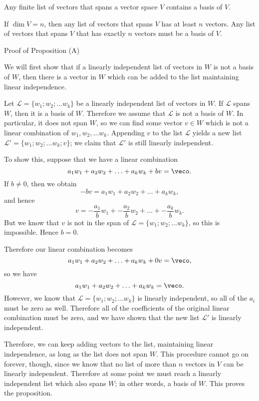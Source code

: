 {} Any finite list of vectors that spans a vector space $V$ contains a basis of $V$.  

{} If $\dim V = n$, then any list of vectors that spans $V$ has
at least $n$ vectors.  Any  list of vectors that spans $V$ that has exactly $n$ vectors must
be a basis of $V$.  


\begin{edXshowhide}{Proof of Proposition (A)}

We will first show that if a linearly independent list of vectors in $W$ is not a basis of $W$, then
there is a vector in $W$ which can be added to the list maintaining linear independence.  

Let $\mathcal{L} = \{w_1; w_2; \ldots w_k\}$ be a linearly independent list of vectors in $W$.  If
$\mathcal{L}$ spans $W$, then it is a basis of $W$.  Therefore we assume that $\mathcal{L}$ is not
a basis of $W$.  In particular, it does not span $W$, so we can find some vector $v\in W$ which is
not a linear combination of $w_1, w_2, \ldots w_k$.  Appending $v$ to the list $\mathcal{L}$
yields a new list $\mathcal{L'}=\{w_1; w_2; \ldots w_k; v\}$; we claim that $\mathcal{L'}$ 
 is still linearly independent.  
 
To show this, suppose that we have a linear combination
\[a_1w_1 + a_2w_2 + \ldots + a_k w_k + bv = \veco.\]  
If $b\ne 0$, then we obtain
\[ -bv = a_1w_1 + a_2w_2 + \ldots + a_k w_k,\]
and hence 
\[v = -\frac{a_1}{b}w_1 + -\frac{a_2}{b}w_2 + \ldots + -\frac{a_k}{b}w_k.\]
But we know that $v$ is not in the span of $\mathcal{L}=\{w_1; w_2; \ldots w_k\}$, so this is impossible.  
Hence $b = 0$.  

Therefore our linear combination becomes
\[a_1w_1 + a_2w_2 + \ldots + a_k w_k + 0v = \veco,\] 
so we have 
\[a_1w_1 + a_2w_2 + \ldots + a_k w_k  = \veco.\] 
However, we know that $\mathcal{L}=\{w_1; w_2; \ldots w_k\}$ is linearly independent, so all
of the $a_i$ must be zero as well.  Therefore all of the coefficients of the original linear combination
must be zero, and we have shown that the new list $\mathcal{L'}$ is linearly independent.  

Therefore, we can keep adding vectors to the list, maintaining
linear independence, as long as the list does not span $W$.  This procedure cannot go on forever, though,
since we know that no list of more than $n$ vectors in $V$ can be linearly independent.  Therefore
at some point we must reach a linearly independent list which also spans $W$; in other words, a basis
of $W$.  This proves the proposition.  

\end{edXshowhide}


